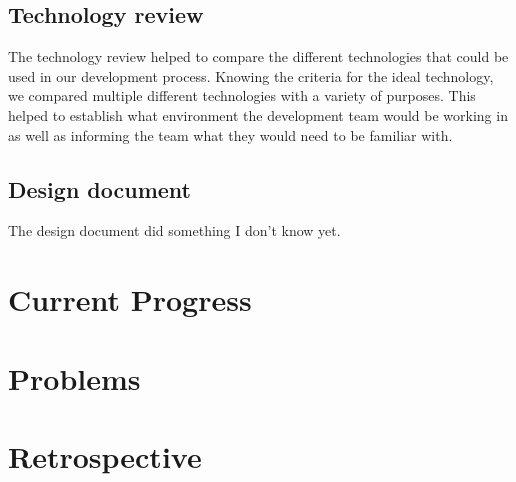 \documentclass[10pt,letterpaper,onecolumn,draftclsnofoot]{IEEEtran}
\begin{document}
\subsection{Technology review}
The technology review helped to compare the different technologies that could be used in our development process. Knowing the criteria for the ideal technology, we compared multiple different technologies with a variety of purposes. This helped to establish what environment the development team would be working in as well as informing the team what they would need to be familiar with.

\subsection{Design document}
The design document did something I don't know yet.

\section{Current Progress}

\section{Problems}

\section{Retrospective}
\end{document}
